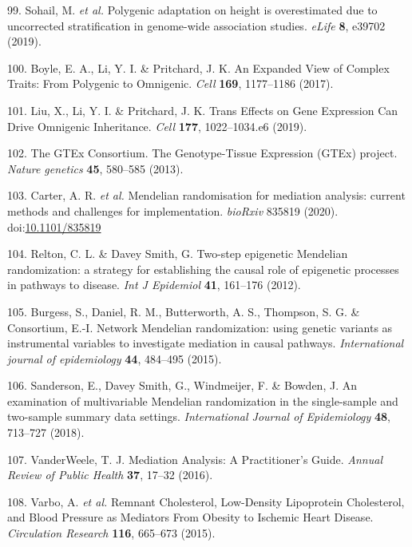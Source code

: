 \documentclass[11pt,twoside]{bristolthesis}
\begin{document}
\leavevmode\hypertarget{ref-Sohail2019}{}%
99. Sohail, M. \emph{et al.} Polygenic adaptation on height is overestimated due to uncorrected stratification in genome-wide association studies. \emph{eLife} \textbf{8}, e39702 (2019).

\leavevmode\hypertarget{ref-Boyle2017}{}%
100. Boyle, E. A., Li, Y. I. \& Pritchard, J. K. An Expanded View of Complex Traits: From Polygenic to Omnigenic. \emph{Cell} \textbf{169}, 1177--1186 (2017).

\leavevmode\hypertarget{ref-Liu2019}{}%
101. Liu, X., Li, Y. I. \& Pritchard, J. K. Trans Effects on Gene Expression Can Drive Omnigenic Inheritance. \emph{Cell} \textbf{177}, 1022--1034.e6 (2019).

\leavevmode\hypertarget{ref-GTEx2013}{}%
102. The GTEx Consortium. The Genotype-Tissue Expression (GTEx) project. \emph{Nature genetics} \textbf{45}, 580--585 (2013).

\leavevmode\hypertarget{ref-Carter2020}{}%
103. Carter, A. R. \emph{et al.} Mendelian randomisation for mediation analysis: current methods and challenges for implementation. \emph{bioRxiv} 835819 (2020). doi:\href{https://doi.org/10.1101/835819}{10.1101/835819}

\leavevmode\hypertarget{ref-Relton2012}{}%
104. Relton, C. L. \& Davey Smith, G. Two-step epigenetic Mendelian randomization: a strategy for establishing the causal role of epigenetic processes in pathways to disease. \emph{Int J Epidemiol} \textbf{41}, 161--176 (2012).

\leavevmode\hypertarget{ref-Burgess2015b}{}%
105. Burgess, S., Daniel, R. M., Butterworth, A. S., Thompson, S. G. \& Consortium, E.-I. Network Mendelian randomization: using genetic variants as instrumental variables to investigate mediation in causal pathways. \emph{International journal of epidemiology} \textbf{44}, 484--495 (2015).

\leavevmode\hypertarget{ref-Sanderson2018}{}%
106. Sanderson, E., Davey Smith, G., Windmeijer, F. \& Bowden, J. An examination of multivariable Mendelian randomization in the single-sample and two-sample summary data settings. \emph{International Journal of Epidemiology} \textbf{48}, 713--727 (2018).

\leavevmode\hypertarget{ref-VanderWeele2016}{}%
107. VanderWeele, T. J. Mediation Analysis: A Practitioner's Guide. \emph{Annual Review of Public Health} \textbf{37}, 17--32 (2016).

\leavevmode\hypertarget{ref-Varbo2015}{}%
108. Varbo, A. \emph{et al.} Remnant Cholesterol, Low-Density Lipoprotein Cholesterol, and Blood Pressure as Mediators From Obesity to Ischemic Heart Disease. \emph{Circulation Research} \textbf{116}, 665--673 (2015).
\end{document}
